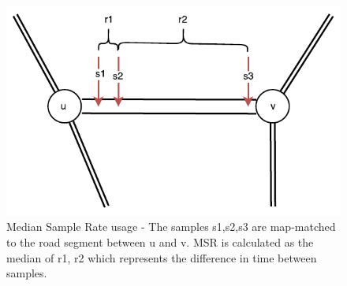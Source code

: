 \begin{figure}[H]
	\centering
	\includegraphics[width=\textwidth]{figures/MSR.pdf}
	\caption{Median Sample Rate usage - The samples s1,s2,s3 are map-matched to the road segment between u and v. MSR is calculated as the median of r1, r2 which represents the difference in time between samples.}
	\label{fig:MSR}
\end{figure}

